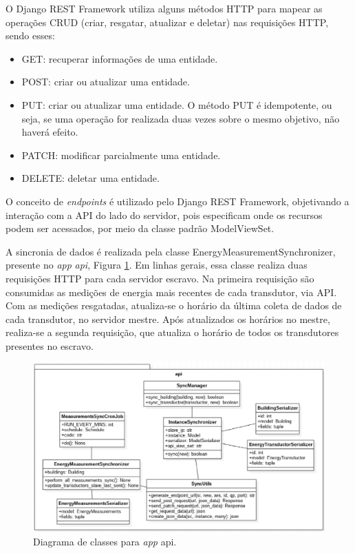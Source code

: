 O Django REST Framework utiliza alguns métodos HTTP para mapear as operações CRUD (criar, resgatar, atualizar e deletar) nas requisições HTTP, sendo esses:

\begin{itemize}
    \item GET: recuperar informações de uma entidade.
    \item POST: criar ou atualizar uma entidade.
    \item PUT: criar ou atualizar uma entidade. O método PUT é idempotente, ou seja, se uma operação for realizada duas vezes sobre o mesmo objetivo, não haverá efeito.
    \item PATCH: modificar parcialmente uma entidade.
    \item DELETE: deletar uma entidade.
\end{itemize}

O conceito de \textit{endpoints} é utilizado pelo Django REST Framework, objetivando a interação com a API do lado do servidor, pois especificam onde os recursos podem ser acessados, por meio da classe padrão ModelViewSet.

A sincronia de dados é realizada pela classe EnergyMeasurementSynchronizer, presente no \textit{app} \textit{api}, Figura \ref{api}. Em linhas gerais, essa classe realiza duas requisições HTTP para cada servidor escravo. Na primeira requisição são consumidas as medições de energia mais recentes de cada transdutor, via API. Com as medições resgatadas, atualiza-se o horário da última coleta de dados de cada transdutor, no servidor mestre. Após atualizados os horários no mestre, realiza-se a segunda requisição, que atualiza o horário de todos os transdutores presentes no escravo.

\begin{figure}[!h]
    \centering
    \includegraphics[keepaspectratio=true,scale=0.55]{figuras/api.eps}
    \caption{Diagrama de classes para \textit{app} api.}
    \label{api}
\end{figure}


